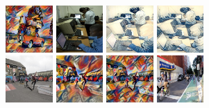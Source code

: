 \documentclass[runningheads]{llncs}
\begin{document}
\begin{figure}
  \includegraphics[width=0.16\textwidth]{23_cvii_mine.jpg}
  \includegraphics[width=0.16\textwidth]{27_orig.jpg}
  \includegraphics[width=0.16\textwidth]{27_wave_baseline.jpg}
  \includegraphics[width=0.16\textwidth]{27_wave_mine.jpg} \\
  \includegraphics[width=0.16\textwidth]{34_orig.jpg}
  \includegraphics[width=0.16\textwidth]{34_cvii_baseline.jpg}
  \includegraphics[width=0.16\textwidth]{34_cvii_mine.jpg}
  \includegraphics[width=0.16\textwidth]{47_orig.jpg}

\end{figure}
\end{document}
